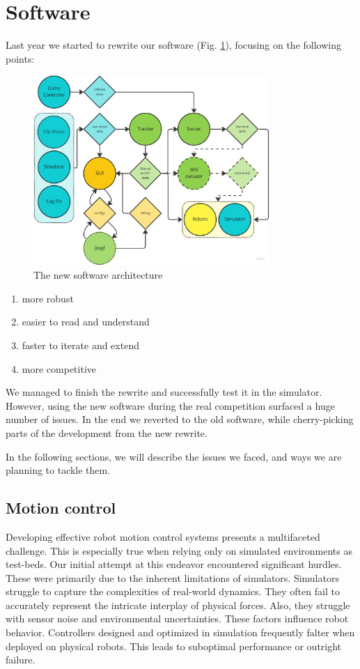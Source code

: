 \documentclass[runningheads]{llncs}
\begin{document}
\section{Software}
Last year we started to rewrite our software (Fig. \ref{fig:software-architecture}), focusing on the following points:

\begin{figure}
    \centering
    \includegraphics[width=0.8\textwidth]{images/software-architecture.jpg}
    \caption{The new software architecture}
    \label{fig:software-architecture}
\end{figure}

\begin{enumerate}
    \item more robust
    \item easier to read and understand
    \item faster to iterate and extend
    \item more competitive
\end{enumerate}

We managed to finish the rewrite and successfully test it in the simulator. However, using the new software during the real competition surfaced a huge number of issues. In the end we reverted to the old software, while cherry-picking parts of the development from the new rewrite.

In the following sections, we will describe the issues we faced, and ways we are planning to tackle them.

\subsection{Motion control}
Developing effective robot motion control systems presents a multifaceted challenge. This is especially true when relying only on simulated environments as test-beds. Our initial attempt at this endeavor encountered significant hurdles. These were primarily due to the inherent limitations of simulators. Simulators struggle to capture the complexities of real-world dynamics. They often fail to accurately represent the intricate interplay of physical forces. Also, they struggle with sensor noise and environmental uncertainties. These factors influence robot behavior. Controllers designed and optimized in simulation frequently falter when deployed on physical robots. This leads to suboptimal performance or outright failure.
\end{document}
